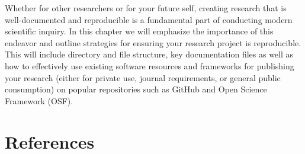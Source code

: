 \documentclass[
  letterpaper,
]{latex/krantz}
\begin{document}
Whether for other researchers or for your future self, creating research
that is well-documented and reproducible is a fundamental part of
conducting modern scientific inquiry. In this chapter we will emphasize
the importance of this endeavor and outline strategies for ensuring your
research project is reproducible. This will include directory and file
structure, key documentation files as well as how to effectively use
existing software resources and frameworks for publishing your research
(either for private use, journal requirements, or general public
consumption) on popular repositories such as GitHub and Open Science
Framework (OSF).


\hypertarget{references}{%
\chapter*{References}\label{references}}

\end{document}
